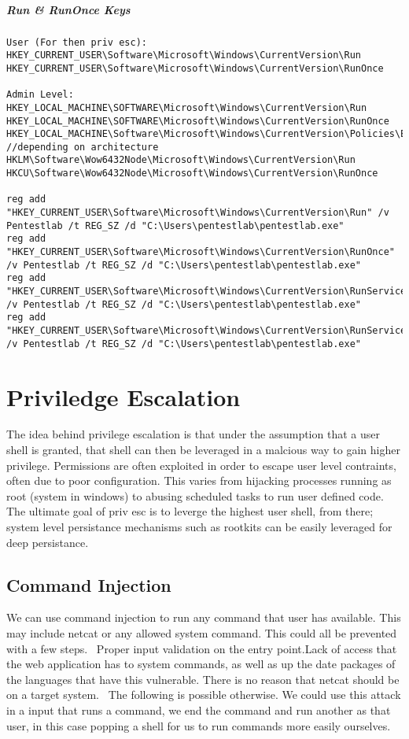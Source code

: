 \subparagraph{Run & RunOnce Keys}
\begin{lstlisting}[label=RegistryRun,caption=Registry Run Locations] 
User (For then priv esc):
HKEY_CURRENT_USER\Software\Microsoft\Windows\CurrentVersion\Run
HKEY_CURRENT_USER\Software\Microsoft\Windows\CurrentVersion\RunOnce

Admin Level:
HKEY_LOCAL_MACHINE\SOFTWARE\Microsoft\Windows\CurrentVersion\Run
HKEY_LOCAL_MACHINE\SOFTWARE\Microsoft\Windows\CurrentVersion\RunOnce
HKEY_LOCAL_MACHINE\Software\Microsoft\Windows\CurrentVersion\Policies\Explorer\Run
//depending on architecture
HKLM\Software\Wow6432Node\Microsoft\Windows\CurrentVersion\Run
HKCU\Software\Wow6432Node\Microsoft\Windows\CurrentVersion\RunOnce

reg add "HKEY_CURRENT_USER\Software\Microsoft\Windows\CurrentVersion\Run" /v Pentestlab /t REG_SZ /d "C:\Users\pentestlab\pentestlab.exe"
reg add "HKEY_CURRENT_USER\Software\Microsoft\Windows\CurrentVersion\RunOnce" /v Pentestlab /t REG_SZ /d "C:\Users\pentestlab\pentestlab.exe"
reg add "HKEY_CURRENT_USER\Software\Microsoft\Windows\CurrentVersion\RunServices" /v Pentestlab /t REG_SZ /d "C:\Users\pentestlab\pentestlab.exe"
reg add "HKEY_CURRENT_USER\Software\Microsoft\Windows\CurrentVersion\RunServicesOnce" /v Pentestlab /t REG_SZ /d "C:\Users\pentestlab\pentestlab.exe"

\end{lstlisting}

\citep{registryRun}

\section{Priviledge Escalation}
The idea behind privilege escalation is that under the assumption that a user shell is granted, that shell can then be leveraged in a malcious way to gain higher privilege.
Permissions are often exploited in order to escape user level contraints, often due to poor configuration. This varies from hijacking processes running as root (system in windows) to
abusing scheduled tasks to run user defined code. The ultimate goal of priv esc is to leverge the highest user shell, from there; system level persistance mechanisms such as rootkits can be easily
leveraged for deep persistance. 

\subsection{Command Injection}
We can use command injection to run any command that user has available. This may include netcat or any allowed system command. This could all be prevented with a few steps. 
Proper input validation on the entry point.Lack of access that the web application has to system commands, as well as up the date packages of the languages that have this vulnerable. There is no reason that netcat should be on a target system. 
The following is possible otherwise. We could use this attack in a input that runs a command, we end the command and run another as that user, in this case popping a shell for us to run commands more easily ourselves.


